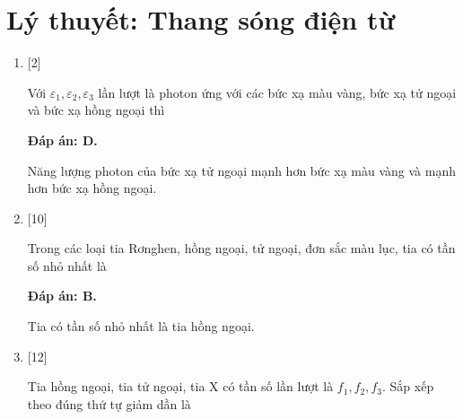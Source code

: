 \section{Lý thuyết: Thang sóng điện từ}
\begin{enumerate}[label=\bfseries Câu \arabic*:]
	
	\item {} [2]
	
	\cauhoi
	{Với $\varepsilon_{1}, \varepsilon_{2}, \varepsilon_{3}$ lần lượt là photon ứng với các bức xạ màu vàng, bức xạ tử ngoại và bức xạ hồng ngoại thì
	}
	
	\loigiai
	{		\textbf{Đáp án: D.}
		
		Năng lượng photon của bức xạ tử ngoại mạnh hơn bức xạ màu vàng và mạnh hơn bức xạ hồng ngoại.
	}
	
	\item {} [10]
	
	\cauhoi
	{Trong các loại tia Rơnghen, hồng ngoại, tử ngoại, đơn sắc màu lục, tia có tần số nhỏ nhất là 
	}
	
	\loigiai
	{		\textbf{Đáp án: B.}
		
		Tia có tần số nhỏ nhất là tia hồng ngoại.
	}

	\item {} [12]
	
	\cauhoi
	{Tia hồng ngoại, tia tử ngoại, tia X có tần số lần lượt là $f_{1}, f_{2}, f_{3}$. Sắp xếp theo đúng thứ tự giảm dần là
	}
	

\end{enumerate}
